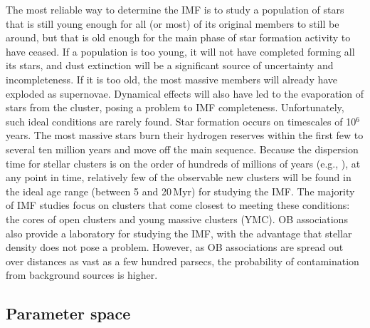 \documentclass[referee]{aa}
\newcommand{\h}[1]{$^{#1}$}
\begin{document}
The most reliable way to determine the IMF is to study a population of stars that is still young enough for all (or most) of its original members to still be around, but that is old enough for the main phase of star formation activity to have ceased.
If a population is too young, it will not have completed forming all its stars, and dust extinction will be a significant source of uncertainty and incompleteness.
  If it is too old, the most massive members will already have exploded as supernovae.
Dynamical effects will also have led to the evaporation of stars from the cluster, posing a problem to IMF completeness.
Unfortunately, such ideal conditions are rarely found.
Star formation occurs on timescales of 10\h6 years.
The most massive stars burn their hydrogen reserves within the first few to several ten million years and move off the main sequence.
Because the dispersion time for stellar clusters is on the order of hundreds of millions of years (e.g., \citealt{Lada2003-ip}), at any point in time, relatively few of the observable new clusters will be found in the ideal age range (between 5 and 20\,Myr) for studying the IMF\@.
The majority of IMF studies focus on clusters that come closest to meeting these conditions: the cores of open clusters and young massive clusters (YMC).
OB associations also provide a laboratory for studying the IMF, with the advantage that stellar density does not pose a problem.
However, as OB associations are spread out over distances as vast as a few hundred parsecs, the probability of contamination from background sources is higher.


\subsection{Parameter space}
\label{subsec:parameter_space}
\end{document}

